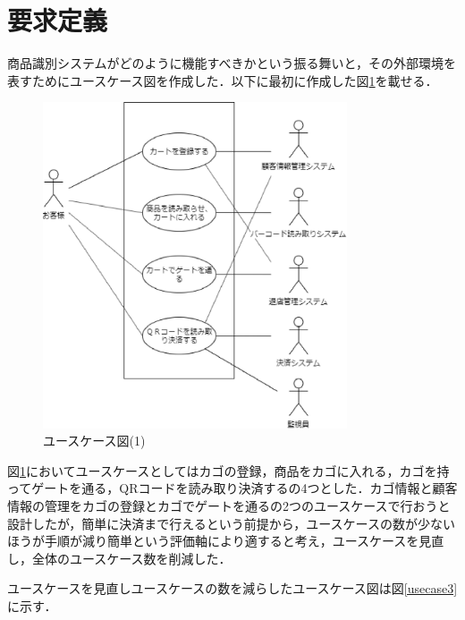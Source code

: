 

\section{要求定義}


商品識別システムがどのように機能すべきかという振る舞いと，その外部環境を表すためにユースケース図を作成した．以下に最初に作成した図\ref{usecase1}を載せる．

\begin{figure}[htbp]
\centering
\includegraphics[width = 9cm]{./picture/usecase1.eps}
\caption{ユースケース図(1)}
\label{usecase1}
\end{figure}


図\ref{usecase1}においてユースケースとしてはカゴの登録，商品をカゴに入れる，カゴを持ってゲートを通る，QRコードを読み取り決済するの4つとした．カゴ情報と顧客情報の管理をカゴの登録とカゴでゲートを通るの2つのユースケースで行おうと設計したが，簡単に決済まで行えるという前提から，ユースケースの数が少ないほうが手順が減り簡単という評価軸により適すると考え，ユースケースを見直し，全体のユースケース数を削減した．


ユースケースを見直しユースケースの数を減らしたユースケース図は図\ref{usecase3}に示す．

